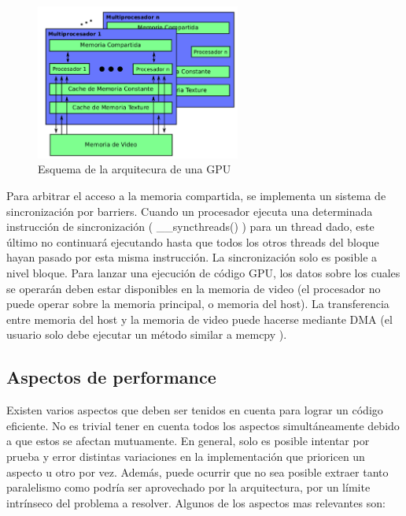 \documentclass[a4paper,10pt]{report}
\begin{document}
\begin{figure}
  \centering
    \includegraphics[width=0.6\textwidth]{img/arquitectura.png}
  \caption{Esquema de la arquitecura de una GPU}
  \label{arquitectura}
\end{figure}


Para arbitrar el acceso a la memoria compartida, se implementa un sistema de sincronización por barriers. 
Cuando un procesador ejecuta una determinada instrucción de sincronización ( \_\_syncthreads() ) para un thread dado, este último no continuará ejecutando hasta que todos los otros threads del bloque
hayan pasado por esta misma instrucción. La sincronización solo es posible a nivel bloque.
Para lanzar una ejecución de código GPU, los datos sobre los cuales se operarán deben estar disponibles en la memoria de video (el procesador no puede operar sobre la memoria principal, o memoria
del host). La transferencia entre memoria del host y la memoria de video puede hacerse mediante DMA (el usuario solo debe ejecutar un método similar a memcpy ).





\subsection{Aspectos de performance}
Existen varios aspectos que deben ser tenidos en cuenta para lograr un código eficiente. No es trivial
tener en cuenta todos los aspectos simultáneamente debido a que estos se afectan mutuamente. En
general, solo es posible intentar por prueba y error distintas variaciones en la implementación que
prioricen un aspecto u otro por vez. Además, puede ocurrir que no sea posible extraer tanto paralelismo
como podría ser aprovechado por la arquitectura, por un límite intrínseco del problema a resolver.
Algunos de los aspectos mas relevantes son:
\end{document}
